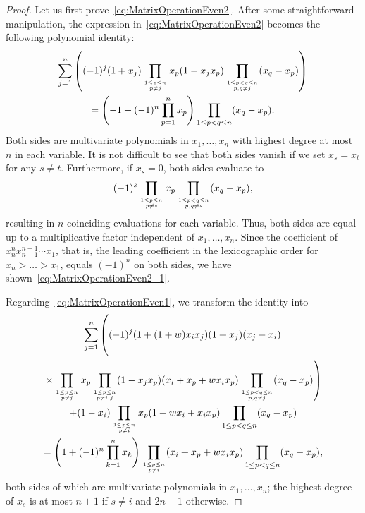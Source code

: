 \documentclass[10pt,a4paper]{article}
\theoremstyle{definition}
\newcommand\myatop[2]{\genfrac{}{}{0pt}{}{#1}{#2}}
\begin{document}
	\begin{proof}
		Let us first prove~\ref{eq:MatrixOperationEven2}. After some straightforward manipulation, the expression in~\ref{eq:MatrixOperationEven2} becomes the following polynomial identity:
		\begin{multline}\label{eq:MatrixOperationEven2_1}
			\sum_{j=1}^{n} \left((-1)^j (1+x_j) \prod_{\myatop{1 \le p \le n}{p \neq j}} x_p(1-x_j x_p) \prod_{\myatop{1 \le p < q\le n}{p,q \neq j}} (x_q - x_p) \right)\\
			=  \left( -1 + (-1)^n \prod_{p=1}^{n} x_p \right)  \prod_{1 \le p < q \le n} (x_q - x_p).
		\end{multline}
		Both sides are multivariate polynomials in $x_1,\dots,x_n$ with highest degree at most $n$ in each variable. It is not difficult to see that both sides vanish if we set $x_s=x_t$ for any $s \neq t$. Furthermore, if $x_s=0$, both sides evaluate to 
		\begin{equation*}
			(-1)^s  \prod_{\myatop{1 \le p \le n}{p \neq s}} x_p \prod_{\myatop{1 \le p < q \le n}{p,q \neq s}} (x_q - x_p),
		\end{equation*}
		resulting in $n$ coinciding evaluations for each variable. Thus, both sides are equal up to a multiplicative factor independent of $x_1,\dots,x_n$. Since the coefficient of $x_n^n x_{n-1}^{n-1} \cdots x_1$, that is, the leading coefficient in the lexicographic order for $x_n > \dots > x_1$, equals $(-1)^n$ on both sides, we have shown~\eqref{eq:MatrixOperationEven2_1}.
		
		Regarding~\ref{eq:MatrixOperationEven1}, we transform the identity into
		\begin{multline}\label{eq:MatrixOperationEven1_1}
			\sum_{j=1}^{n} \left( \vphantom{ \prod_{\myatop{1 \le p < q \le n}{p,q \neq j}}}  (-1)^{j} (1+(1+w) x_i x_j) (1+x_j) (x_j-x_i) \right.\\
			\left. \times \prod_{\myatop{1 \le p \le n}{p \neq j}} x_p \prod_{\myatop{1 \le p \le n}{p \neq i,j}} (1-x_j x_p)  (x_i+x_p+w x_i x_p) \prod_{\myatop{1 \le p < q \le n}{p,q \neq j}} (x_q - x_p) \right) \\
			+ (1-x_i)  \prod\limits_{\myatop{1 \le p \le n}{p \neq i}} x_p (1+ w x_i + x_i x_p) \prod_{1 \le p <q \le n} (x_q -x_p)\\
			= \left(1+ (-1)^n \prod_{k=1}^{n} x_k \right) \prod_{\myatop{1 \le p \le n}{p \neq i}} (x_i+x_p+w x_i x_p) \prod_{1 \le p < q \le n } (x_q -x_p),
		\end{multline}
		both sides of which are multivariate polynomials in $x_1,\dots,x_n$; the highest degree of $x_s$ is at most $n+1$ if $s \neq i$ and $2n-1$ otherwise.
		

\end{proof}
\end{document}
